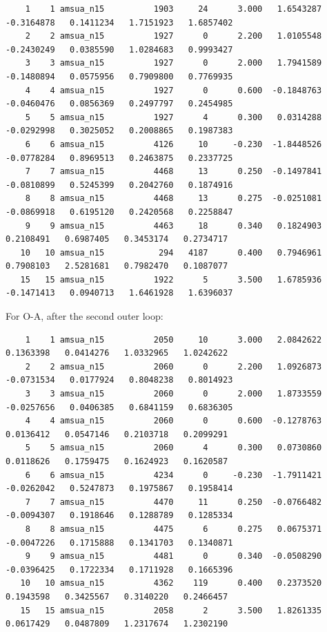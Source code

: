 \begin{scriptsize}
\begin{verbatim}
    1    1 amsua_n15          1903     24      3.000   1.6543287  -0.3164878   0.1411234   1.7151923   1.6857402
    2    2 amsua_n15          1927      0      2.200   1.0105548  -0.2430249   0.0385590   1.0284683   0.9993427
    3    3 amsua_n15          1927      0      2.000   1.7941589  -0.1480894   0.0575956   0.7909800   0.7769935
    4    4 amsua_n15          1927      0      0.600  -0.1848763  -0.0460476   0.0856369   0.2497797   0.2454985
    5    5 amsua_n15          1927      4      0.300   0.0314288  -0.0292998   0.3025052   0.2008865   0.1987383
    6    6 amsua_n15          4126     10     -0.230  -1.8448526  -0.0778284   0.8969513   0.2463875   0.2337725
    7    7 amsua_n15          4468     13      0.250  -0.1497841  -0.0810899   0.5245399   0.2042760   0.1874916
    8    8 amsua_n15          4468     13      0.275  -0.0251081  -0.0869918   0.6195120   0.2420568   0.2258847
    9    9 amsua_n15          4463     18      0.340   0.1824903   0.2108491   0.6987405   0.3453174   0.2734717
   10   10 amsua_n15           294   4187      0.400   0.7946961   0.7908103   2.5281681   0.7982470   0.1087077
   15   15 amsua_n15          1922      5      3.500   1.6785936  -0.1471413   0.0940713   1.6461928   1.6396037
\end{verbatim}
\end{scriptsize}

\hspace{4ex} For O-A, after the second outer loop:
 
\begin{scriptsize}
\begin{verbatim}
    1    1 amsua_n15          2050     10      3.000   2.0842622   0.1363398   0.0414276   1.0332965   1.0242622
    2    2 amsua_n15          2060      0      2.200   1.0926873  -0.0731534   0.0177924   0.8048238   0.8014923
    3    3 amsua_n15          2060      0      2.000   1.8733559  -0.0257656   0.0406385   0.6841159   0.6836305
    4    4 amsua_n15          2060      0      0.600  -0.1278763   0.0136412   0.0547146   0.2103718   0.2099291
    5    5 amsua_n15          2060      4      0.300   0.0730860   0.0118626   0.1759475   0.1624923   0.1620587
    6    6 amsua_n15          4234      0     -0.230  -1.7911421  -0.0262042   0.5247873   0.1975867   0.1958414
    7    7 amsua_n15          4470     11      0.250  -0.0766482  -0.0094307   0.1918646   0.1288789   0.1285334
    8    8 amsua_n15          4475      6      0.275   0.0675371  -0.0047226   0.1715888   0.1341703   0.1340871
    9    9 amsua_n15          4481      0      0.340  -0.0508290  -0.0396425   0.1722334   0.1711928   0.1665396
   10   10 amsua_n15          4362    119      0.400   0.2373520   0.1943598   0.3425567   0.3140220   0.2466457
   15   15 amsua_n15          2058      2      3.500   1.8261335   0.0617429   0.0487809   1.2317674   1.2302190
\end{verbatim}
\end{scriptsize}

